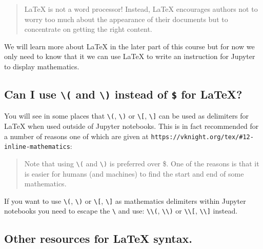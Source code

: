 \begin{quote}
LaTeX\; is not a word processor! Instead, LaTeX\; encourages authors not to worry
too much about the appearance of their documents but to concentrate on getting
the right content.
\end{quote}


We will learn more about \LaTeX\; in the later part of this course but for
now we only need to know that it we can use \LaTeX\; to write an instruction
for Jupyter to display mathematics.


\subsection{Can I use \texttt{\textbackslash(} and \texttt{\textbackslash)} instead of \texttt{\$} for \LaTeX?}

You will see in some places that \texttt{\textbackslash(},
\texttt{\textbackslash)} or \texttt{\textbackslash[},
\texttt{\textbackslash]} can be used as delimiters for
\LaTeX\; when used outside of Jupyter notebooks. This is in fact recommended for a
number of reasons one of which are given at
\texttt{https://vknight.org/tex/\#12-inline-mathematics}:

\begin{quote}
    Note that using \texttt{\textbackslash(} and \texttt{\textbackslash)} is preferred over \$. One of the reasons is that it
is easier for humans (and machines) to find the start and end of some
mathematics.
\end{quote}


If you want to use \texttt{\textbackslash(}, \texttt{\textbackslash)} or
\texttt{\textbackslash[}, \texttt{\textbackslash]} as
mathematics delimiters within Jupyter notebooks you need to escape the
\texttt{\textbackslash} and use: \texttt{\textbackslash\textbackslash(},
\texttt{\textbackslash\textbackslash)} or
\texttt{\textbackslash\textbackslash[},
\texttt{\textbackslash\textbackslash]} instead.


\subsection{Other resources for \LaTeX\; syntax.}
\label{\detokenize{tools-for-mathematics/01-using-notebooks/why/main:other-resources-for-latex-syntax}}

